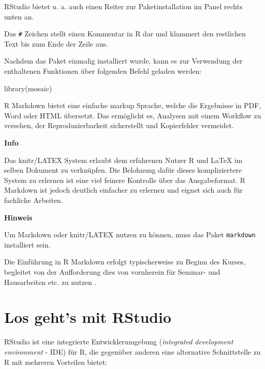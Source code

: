 \documentclass[
  ngerman,
]{scrbook}
\newenvironment{Shaded}{\begin{snugshade}}{\end{snugshade}}
\newcommand{\FunctionTok}[1]{\textcolor[rgb]{0.00,0.00,0.00}{#1}}
\newcommand{\NormalTok}[1]{#1}
\newenvironment{infobox}[1]
  {
  \begin{itemize}
  \renewcommand{\labelitemi}{
    \raisebox{1.8\height}[0pt][0pt]{
       {\setkeys{Gin}{width=7em,keepaspectratio}
        {\Large \textcolor{dark-fom-green}\faLightbulbO}}
        }
  }
  \begin{blackbox}
        \bgroup\color{dark-fom-green}
          {\textbf{Info}}
        \egroup
  \item
  }
  {
  \end{blackbox}
  \end{itemize}
  }
\newenvironment{hinweis}[1]
  {
  \begin{itemize}
  \renewcommand{\labelitemi}{
    \raisebox{1.8\height}[0pt][0pt]{
      {\setkeys{Gin}{width=7em,keepaspectratio}
        {\Large \textcolor{dark-fom-green}\faHandORight}}
        }
  }
  \begin{blackbox}
        \bgroup\color{dark-fom-green}
          {\textbf{Hinweis}}
        \egroup
  \item
  }
  {
  \end{blackbox}
  \end{itemize}
  }
\newenvironment{note}[1]
  {
  \begin{itemize}
  \renewcommand{\labelitemi}{
    \raisebox{-.01\height}[0pt][0pt]{
      {\setkeys{Gin}{width=7em,keepaspectratio}
        {\normalsize \textcolor{dark-fom-green}\faHashtag}}
        }
  }
  \begin{blackbox}
   \item
    }
    {
  \end{blackbox}
  \end{itemize}
  }
\begin{document}
\begin{note}{note}
\textsf{RStudio} bietet u. a. auch einen Reiter zur Paketinstallation im Panel rechts unten an.

\end{note}

Das \texttt{\#} Zeichen stellt einen Kommentar in R dar und klammert den restlichen Text bis zum Ende der Zeile aus.

Nachdem das Paket einmalig installiert wurde, kann es zur Verwendung der enthaltenen Funktionen über folgenden Befehl geladen werden:

\begin{Shaded}
\begin{Highlighting}[]
\FunctionTok{library}\NormalTok{(mosaic)}
\end{Highlighting}
\end{Shaded}

\textsf{R Markdown} bietet eine einfache markup Sprache, welche die Ergebnisse in PDF, Word oder HTML übersetzt. Das ermöglicht es, Analysen mit einem Workflow zu versehen, der Reproduzierbarkeit sicherstellt und Kopierfehler vermeidet.

\begin{infobox}{infobox}
Das \textsf{knitr/LATEX} System erlaubt dem erfahrenen Nutzer \textsf{R} und \textsf{LaTeX} im selben Dokument zu verknüpfen. Die Belohnung dafür dieses kompliziertere System zu erlernen ist eine viel feinere Kontrolle über das Ausgabeformat. \textsf{R Markdown} ist jedoch deutlich einfacher zu erlernen und eignet sich auch für fachliche Arbeiten.

\end{infobox}

\begin{hinweis}{hinweise}
Um \textsf{Markdown} oder \textsf{knitr/LATEX} nutzen zu können, muss das Paket \texttt{markdown} installiert sein.

\end{hinweis}

Die Einführung in \textsf{R Markdown} erfolgt typischerweise zu Beginn des Kurses, begleitet von der Aufforderung dies von vornherein für Seminar- und Hausarbeiten etc. zu nutzen \autocite{baumer2014r}.

\hypertarget{RStudio}{%
\chapter{Los geht's mit RStudio}\label{RStudio}}

\textsf{RStudio} ist eine integrierte Entwicklerumgebung (\emph{integrated development environment} - IDE) für \textsf{R}, die gegenüber anderen eine alternative Schnittstelle zu \textsf{R} mit mehreren Vorteilen bietet:
\end{document}
